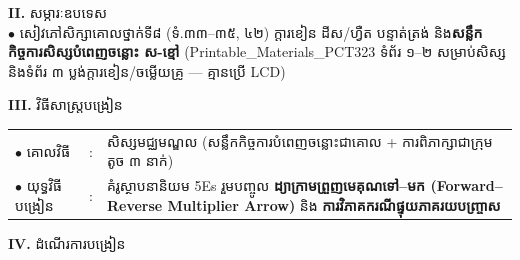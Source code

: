 \documentclass[a4paper,10pt]{article}
\newcommand{\en}[1]{{\TimesEn #1}}
\begin{document}
{%
\textbf{II.} {\muol សម្ភារៈឧបទេស}\\[1pt]
\hspace*{0.55cm}$\bullet$ \hspace{0.35cm} សៀវភៅសិក្សាគោលថ្នាក់ទី៨ (ទំ.៣៣–៣៥, ៤២) ក្ដារខៀន ដីស/ហ្វឺត បន្ទាត់ត្រង់ និង\textbf{សន្លឹកកិច្ចការសិស្សបំពេញចន្លោះ ស-ខ្មៅ} (\en{Printable\_Materials\_PCT323} ទំព័រ ១–២ សម្រាប់សិស្ស និងទំព័រ ៣ ប្លង់ក្ដារខៀន/ចម្លើយគ្រូ — គ្មានប្រើ \en{LCD})

\vspace{2pt}

\textbf{III.} {\muol វិធីសាស្រ្តបង្រៀន}\\[1pt]
\hspace*{0.45cm}%
\begin{tabular}{@{}l l L{14.85cm}@{}}
  $\bullet$ \hspace{0.25cm} គោលវិធី & : & សិស្សមជ្ឈមណ្ឌល (សន្លឹកកិច្ចការបំពេញចន្លោះជាគោល + ការពិភាក្សាជាក្រុមតូច ៣ នាក់) \\
  $\bullet$ \hspace{0.25cm} យុទ្ធវិធីបង្រៀន & : & គំរូស្ថាបនានិយម \en{5Es} រួមបញ្ចូល \textbf{ដ្យាក្រាមព្រួញមេគុណទៅ–មក (\en{Forward--Reverse Multiplier Arrow})} និង \textbf{ការវិភាគករណីផ្ទុយភាគរយបញ្ច្រាស} \\
\end{tabular}
}

\vspace{2pt}

\textbf{IV.} {\muol ដំណើរការបង្រៀន}
\end{document}

